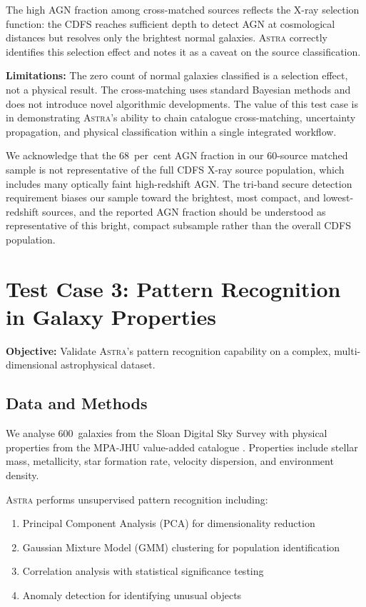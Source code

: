 \documentclass[usenatbib]{rasti}
\newcommand{\astra}{\textsc{Astra}\xspace}
\begin{document}
The high AGN fraction among cross-matched sources reflects the X-ray selection function: the CDFS reaches sufficient depth to detect AGN at cosmological distances but resolves only the brightest normal galaxies.
\astra correctly identifies this selection effect and notes it as a caveat on the source classification.

\textbf{Limitations:} The zero count of normal galaxies classified is a selection effect, not a physical result.
The cross-matching uses standard Bayesian methods and does not introduce novel algorithmic developments.
The value of this test case is in demonstrating \astra's ability to chain catalogue cross-matching, uncertainty propagation, and physical classification within a single integrated workflow.

We acknowledge that the 68~per~cent AGN fraction in our 60-source matched sample is not representative of the full CDFS X-ray source population, which includes many optically faint high-redshift AGN.
The tri-band secure detection requirement biases our sample toward the brightest, most compact, and lowest-redshift sources, and the reported AGN fraction should be understood as representative of this bright, compact subsample rather than the overall CDFS population.

\section{Test Case 3: Pattern Recognition in Galaxy Properties}
\label{sec:tc3}

\textbf{Objective:} Validate \astra's pattern recognition capability on a complex, multi-dimensional astrophysical dataset.

\subsection{Data and Methods}
\label{sec:tc3:data}

We analyse 600~galaxies from the Sloan Digital Sky Survey \citep[SDSS;][]{Abazajian2009} with physical properties from the MPA-JHU value-added catalogue \citep{Brinchmann2004}.
Properties include stellar mass, metallicity, star formation rate, velocity dispersion, and environment density.

\astra performs unsupervised pattern recognition including:
\begin{enumerate}
  \item[(i)] Principal Component Analysis (PCA) for dimensionality reduction
  \item[(ii)] Gaussian Mixture Model (GMM) clustering for population identification
  \item[(iii)] Correlation analysis with statistical significance testing
  \item[(iv)] Anomaly detection for identifying unusual objects
\end{enumerate}
\end{document}
